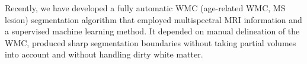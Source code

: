 Recently, we have developed a fully automatic WMC (age-related WMC, MS lesion) segmentation algorithm \cite{22921728} that employed multispectral MRI information and a supervised machine learning method. It depended on manual delineation of the WMC, produced sharp segmentation boundaries without taking partial volumes into account and without handling dirty white matter.
    
    